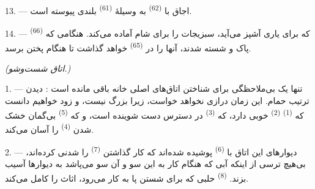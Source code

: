 13. --- اجاق با  \textsuperscript{(62)} به وسیلهٔ
 \textsuperscript{(61)} بلندی پیوسته است.

14. ---  \textsuperscript{(66)} که برای یاری
آشپز می‌آید، سبزیجات را برای شام آماده می‌کند. هنگامی که پاک و شسته
شدند، آنها را در  \textsuperscript{(65)} خواهد گذاشت تا
هنگام پختن برسد.

\VUsaut{4.0mm}
{\centering\fontsize{10.2pt}{10.2pt}\selectfont{} \textit{(اتاق شست‌وشو.)}\par}
\VUsaut{3.0mm}

1. --- تنها یک بی‌ملاحظگی برای شناختن اتاق‌های اصلی خانه باقی مانده
است : دیدن ترتیب حمام. این زمان درازی نخواهد خواست، زیرا بزرگ نیست، و
زود خواهیم دانست که  \textsuperscript{(1)}  \textsuperscript{(2)} خوبی دارد، که 
\textsuperscript{(3)} در دسترس دست شوینده است، و که 
\textsuperscript{(5)} بی‌گمان خشک شدن 
\textsuperscript{(4)} را آسان می‌کند.

2. --- دیوارهای این اتاق با  \textsuperscript{(6)} پوشیده
شده‌اند که کار گذاشتن  \textsuperscript{(7)} را
شدنی کرده‌اند، بی‌هیچ ترسی از اینکه آبی که هنگام کار به این سو و آن سو
می‌پاشد به دیوارها آسیب بزند.  \textsuperscript{(8)}
حلبی که برای شستن پا به کار می‌رود، اثاث را کامل می‌کند.

\VUsaut{6.0mm}
\VUfilet{22mm}

